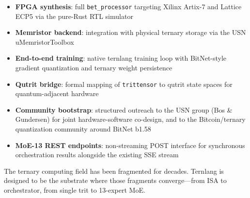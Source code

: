 \documentclass[journal,10pt,twocolumn]{IEEEtran}
\begin{document}
\begin{itemize}
  \item \textbf{FPGA synthesis}: full \texttt{bet\_processor} targeting
        Xilinx Artix-7 and Lattice ECP5 via the pure-Rust RTL simulator
  \item \textbf{Memristor backend}: integration with physical ternary storage
        via the USN uMemristorToolbox~\cite{bos2020ternary}
  \item \textbf{End-to-end training}: native ternlang training loop with
        BitNet-style gradient quantization and ternary weight persistence
  \item \textbf{Qutrit bridge}: formal mapping of \texttt{trittensor} to
        qutrit state spaces for quantum-adjacent hardware
  \item \textbf{Community bootstrap}: structured outreach to the USN group
        (Bos \& Gundersen) for joint hardware-software co-design, and
        to the Bitcoin/ternary quantization community around BitNet b1.58
  \item \textbf{MoE-13 REST endpoints}: non-streaming POST interface for
        synchronous orchestration results alongside the existing SSE stream
\end{itemize}

The ternary computing field has been fragmented for decades. Ternlang is
designed to be the substrate where those fragments converge—from ISA to
orchestrator, from single trit to 13-expert MoE.



\end{document}
